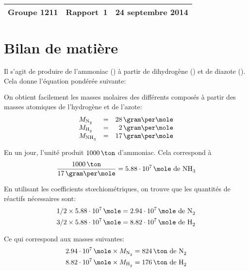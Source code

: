 \documentclass[a4paper,12pt]{article}
\begin{document}
\begin{center}
\begin{tabu} to \textwidth {lX[c]r}
    Groupe 1211 & \large{\textbf{Rapport~1}} & 24 septembre 2014 \\
    \hline
\end{tabu}
\end{center}

\section{Bilan de matière}
\label{sec:matiere}

Il s'agit de produire de l'ammoniac () à partir de dihydrogène ()
et de diazote ().
Cela donne l'équation pondérée suivante:
\begin{center}
\end{center}

On obtient facilement les masses molaires des différents composés à partir
des masses atomiques de l'hydrogène et de l'azote:
\begin{equation*}
    \begin{array}{lcr}
        M_{\ce{N2}} &=& 28\,\gram\per\mole\\
        M_{\ce{H2}} &=& 2\,\gram\per\mole\\
        M_{\ce{NH3}} &=& 17\,\gram\per\mole\\
    \end{array}
\end{equation*}

En un jour, l'unité produit $1000\,\ton$ d'ammoniac.
Cela correspond à
\begin{equation}
    \label{eq:mole-nh3}
    \frac{1000\,\ton}{17\,\gram\per\mole} =
    5.88\cdot10^7\,\mole\mbox{ de \ce{NH3}}
\end{equation}

En utilisant les coefficients stœchiométriques, on trouve que les quantités de
réactifs nécessaires sont:
\begin{align*}
    1/2 \times 5.88\cdot10^7\,\mole &=
    2.94\cdot10^7\,\mole \mbox{ de \ce{N2}} \\
    3/2 \times 5.88\cdot10^7\,\mole &=
    8.82\cdot10^7\,\mole \mbox{ de \ce{H2}} \\
\end{align*}

Ce qui correspond aux masses suivantes:
\begin{align*}
    2.94\cdot10^7\,\mole \times M_{\ce{N2}} &= 824\,\ton \mbox{ de \ce{N2}} \\
    8.82\cdot10^7\,\mole \times M_{\ce{H2}} &= 176\,\ton \mbox{ de \ce{H2}} \\
\end{align*}
\end{document}
